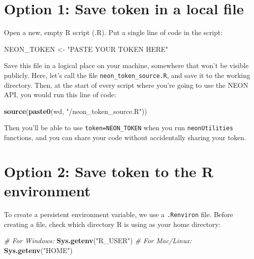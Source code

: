 \documentclass[]{book}
\newenvironment{Shaded}{\begin{snugshade}}{\end{snugshade}}
\newcommand{\CommentTok}[1]{\textcolor[rgb]{0.56,0.35,0.01}{\textit{#1}}}
\newcommand{\KeywordTok}[1]{\textcolor[rgb]{0.13,0.29,0.53}{\textbf{#1}}}
\newcommand{\NormalTok}[1]{#1}
\newcommand{\StringTok}[1]{\textcolor[rgb]{0.31,0.60,0.02}{#1}}
\begin{document}
\hypertarget{option-1-save-token-in-a-local-file}{%
\section{Option 1: Save token in a local file}\label{option-1-save-token-in-a-local-file}}

Open a new, empty R script (.R). Put a single line of code in the script:

\begin{Shaded}
\begin{Highlighting}[]
\NormalTok{NEON_TOKEN <-}\StringTok{ "PASTE YOUR TOKEN HERE"}
\end{Highlighting}
\end{Shaded}

Save this file in a logical place on your machine, somewhere that won't be
visible publicly. Here, let's call the file \texttt{neon\_token\_source.R}, and
save it to the working directory. Then, at the start of
every script where you're going to use the NEON API, you would run this line
of code:

\begin{Shaded}
\begin{Highlighting}[]
\KeywordTok{source}\NormalTok{(}\KeywordTok{paste0}\NormalTok{(wd, }\StringTok{"/neon_token_source.R"}\NormalTok{))}
\end{Highlighting}
\end{Shaded}

Then you'll be able to use \texttt{token=NEON\_TOKEN} when you run \texttt{neonUtilities}
functions, and you can share your code without accidentally sharing your
token.

\hypertarget{option-2-save-token-to-the-r-environment}{%
\section{Option 2: Save token to the R environment}\label{option-2-save-token-to-the-r-environment}}

To create a persistent environment variable, we use a \texttt{.Renviron} file.
Before creating a file, check which directory R is using as your home
directory:

\begin{Shaded}
\begin{Highlighting}[]
\CommentTok{# For Windows:}
\KeywordTok{Sys.getenv}\NormalTok{(}\StringTok{"R_USER"}\NormalTok{)}
\CommentTok{# For Mac/Linux:}
\KeywordTok{Sys.getenv}\NormalTok{(}\StringTok{"HOME"}\NormalTok{)}
\end{Highlighting}
\end{Shaded}
\end{document}

